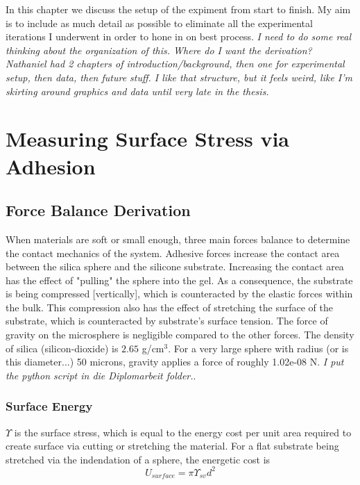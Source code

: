 In this chapter we discuss the setup of the expiment from start to finish. My aim is to include as much detail as possible to eliminate all the experimental iterations I underwent in order to hone in on best process. \emph{I need to do some real thinking about the organization of this. Where do I want the derivation? Nathaniel had 2 chapters of introduction/background, then one for experimental setup, then data, then future stuff. I like that structure, but it feels weird, like I'm skirting around graphics and data until very late in the thesis.}


\section{Measuring Surface Stress via Adhesion}

\subsection{Force Balance Derivation}
When materials are soft or small enough, three main forces balance to determine the contact mechanics of the system. Adhesive forces increase the contact area between the silica sphere and the silicone substrate. Increasing the contact area has the effect of "pulling" the sphere into the gel. As a consequence, the substrate is being compressed [vertically], which is counteracted by the elastic forces within the bulk. This compression also has the effect of stretching the surface of the substrate, which is counteracted by substrate's surface tension. The force of gravity on the microsphere is negligible compared to the other forces. The density of silica (silicon-dioxide) is $2.65$ g/cm$^3$. For a very large sphere with radius (or is this diameter...) 50 microns, gravity applies a force of roughly 1.02e-08 N. \emph{I put the python script in die Diplomarbeit folder.}.

\subsubsection{Surface Energy}
$\Upsilon$ is the surface stress, which is equal to the energy cost per unit area required to create surface via cutting or stretching the material. For a flat substrate being stretched via the indendation of a sphere, the energetic cost is
\begin{equation}
\label{surface_energy}
U_{surface} = \pi \Upsilon_{sv}d^2
\end{equation}

